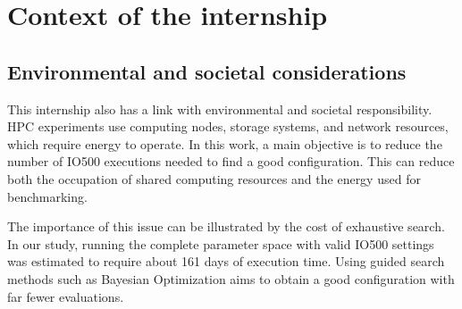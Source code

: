 \section{Context of the internship}



\label{sec:context}



\subsection{Environmental and societal considerations}
\label{sec:sustainability}

This internship also has a link with environmental and societal
responsibility. HPC experiments use computing nodes, storage systems, and
network resources, which require energy to operate. In this work, a main
objective is to reduce the number of IO500 executions needed to find a
good configuration. This can reduce both the occupation of shared
computing resources and the energy used for benchmarking.

The importance of this issue can be illustrated by the cost of exhaustive
search. In our study, running the complete parameter space with valid
IO500 settings was estimated to require about 161 days of execution time.
Using guided search methods such as Bayesian Optimization aims to obtain
a good configuration with far fewer evaluations.

